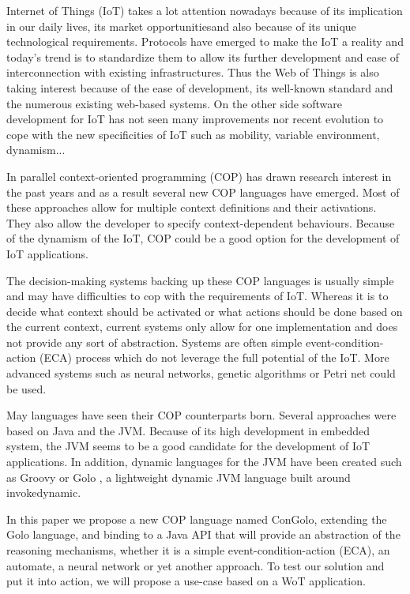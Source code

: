 \documentclass[a4paper]{article}
\begin{document}
Internet of Things (IoT) takes a lot attention nowadays because of its implication in our daily lives, its market opportunitiesand also because of its unique technological requirements. Protocols have emerged to make the IoT a reality and today's trend is to standardize them to allow its further development and ease of interconnection with existing infrastructures. Thus the Web of Things is also taking interest because of the ease of development, its well-known standard and the numerous existing web-based systems. On the other side software development for IoT has not seen many improvements nor recent evolution to cope with the new specificities of IoT such as mobility, variable environment, dynamism...

In parallel context-oriented programming (COP) has drawn research interest in the past years and as a result several new COP languages have emerged. Most of these approaches allow for multiple context definitions and their activations. They also allow the developer to specify context-dependent behaviours. Because of the dynamism of the IoT, COP could be a good option for the development of IoT applications.

The decision-making systems backing up these COP languages is usually simple and may have difficulties to cop with the requirements of IoT. Whereas it is to decide what context should be activated or what actions should be done based on the current context, current systems only allow for one implementation and does not provide any sort of abstraction. Systems are often simple event-condition-action (ECA) process which do not leverage the full potential of the IoT. More advanced systems such as neural networks, genetic algorithms or Petri net could be used.

May languages have seen their COP counterparts born. Several approaches were based on Java and the JVM. Because of its high development in embedded system, the JVM seems to be a good candidate for the development of IoT applications. In addition, dynamic languages for the JVM have been created such as Groovy or Golo \cite{ponge_golo_2013}, a lightweight dynamic JVM language built around invokedynamic.

In this paper we propose a new COP language named ConGolo, extending the Golo language, and binding to a Java API that will provide an abstraction of the reasoning mechanisms, whether it is a simple event-condition-action (ECA), an automate, a neural network or yet another approach. To test our solution and put it into action, we will propose a use-case based on a WoT application.
\end{document}
